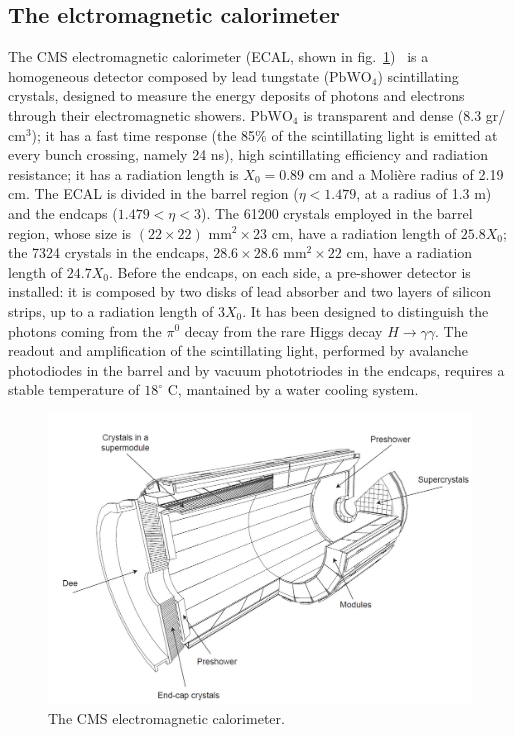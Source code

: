 \subsection{The elctromagnetic calorimeter}
The CMS electromagnetic calorimeter (ECAL, shown in fig.~\ref{fig:CMS_ecal})~\cite{ECAL-TDR} is a homogeneous detector composed by lead tungstate ($\text{PbWO}_4$) scintillating crystals, designed to measure the energy deposits of photons and electrons through their electromagnetic showers. $\text{PbWO}_4$ is transparent and dense (8.3 gr/$\text{cm}^3$); it has a fast time response (the 85\% of the scintillating light is emitted at every bunch crossing, namely 24 ns), high scintillating efficiency and radiation resistance; it has a radiation length is $X_0 = 0.89$ cm and a Moli\`ere radius of 2.19 cm. The ECAL is divided in the barrel region ($\eta < 1.479$, at a radius of 1.3 m) and the endcaps ($1.479 < \eta < 3$).  The 61200 crystals employed in the barrel region, whose size is $(22 \times 22) \text{ mm}^2 \times 23 \text{ cm}$, have a radiation length of $25.8 X_0$; the 7324 crystals in the endcaps, $ 28.6 \times 28.6 \text{ mm}^2 \times 22 \text{ cm}$, have a radiation length of $24.7 X_0$. Before the endcaps, on each side, a pre-shower detector is installed: it is composed by two disks of lead absorber and two layers of silicon strips, up to a radiation length of $3X_0$. It has been designed to distinguish the photons coming from the $\pi^0$ decay from the rare Higgs decay $H \rightarrow \gamma \gamma$. The readout and amplification of the scintillating light, performed by avalanche photodiodes in the barrel and by vacuum phototriodes in the endcaps, requires a stable temperature of $18^{\circ}$ C, mantained by a water cooling system.

\begin{figure}[!htb]
  \centering
    \includegraphics[width=.7\textwidth]{figures/cmsecal.png}
  \caption{The CMS electromagnetic calorimeter.}
  \label{fig:CMS_ecal}
\end{figure}

